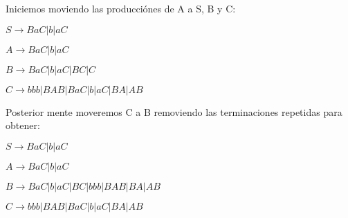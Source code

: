 Iniciemos moviendo las producci\'ones de A a S, B y C:

\begin{center}
    $S \rightarrow BaC | b | aC$

    $A \rightarrow BaC | b | aC$

    $B \rightarrow BaC | b | aC | BC | C$    

    $C \rightarrow bbb | BAB | BaC | b | aC | BA | AB$
\end{center}

Posterior mente moveremos C a B removiendo las terminaciones repetidas para obtener:

\begin{center}
    $S \rightarrow BaC | b | aC$

    $A \rightarrow BaC | b | aC$

    $B \rightarrow BaC | b | aC | BC | bbb | BAB | BA | AB$    

    $C \rightarrow bbb | BAB | BaC | b | aC | BA | AB$
\end{center}

